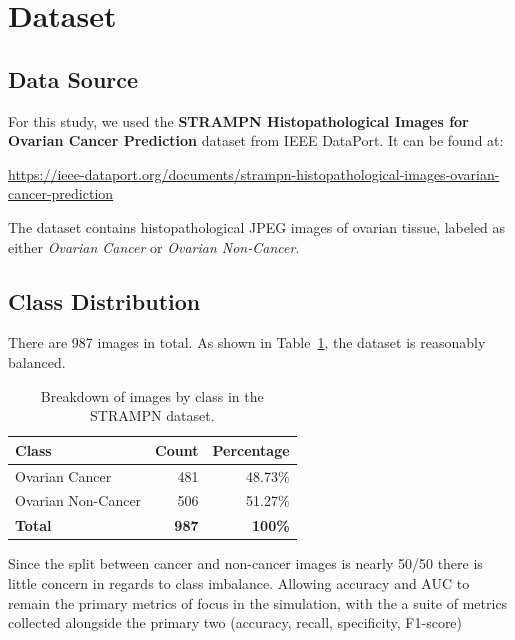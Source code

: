 \section{Dataset}
\label{sec:dataset}

\subsection{Data Source}

For this study, we used the \textbf{STRAMPN Histopathological Images for Ovarian Cancer Prediction} dataset from IEEE DataPort. It can be found at:

\begin{center}
\url{https://ieee-dataport.org/documents/strampn-histopathological-images-ovarian-cancer-prediction}
\end{center}

The dataset contains histopathological JPEG images of ovarian tissue, labeled as either \emph{Ovarian Cancer} or \emph{Ovarian Non-Cancer}. 

\subsection{Class Distribution}

There are 987 images in total. As shown in Table~\ref{tab:class-composition}, the dataset is reasonably balanced.

\begin{table}[H]
  \centering
  \caption{Breakdown of images by class in the STRAMPN dataset.}
  \label{tab:class-composition}
  \begin{tabular}{lrr}
    \toprule
    \rowcolor{tableheader}
    \textbf{Class} & \textbf{Count} & \textbf{Percentage} \\
    \midrule
    Ovarian Cancer     & 481 & 48.73\% \\
    Ovarian Non-Cancer & 506 & 51.27\% \\
    \midrule
    \textbf{Total}     & \textbf{987} & \textbf{100\%} \\
    \bottomrule
  \end{tabular}
\end{table}

Since the split between cancer and non-cancer images is nearly 50/50 there is little concern in regards to class imbalance. Allowing accuracy and AUC to remain the primary metrics of focus in the simulation, with the a suite of metrics collected alongside the primary two (accuracy, recall, specificity, F1-score)

